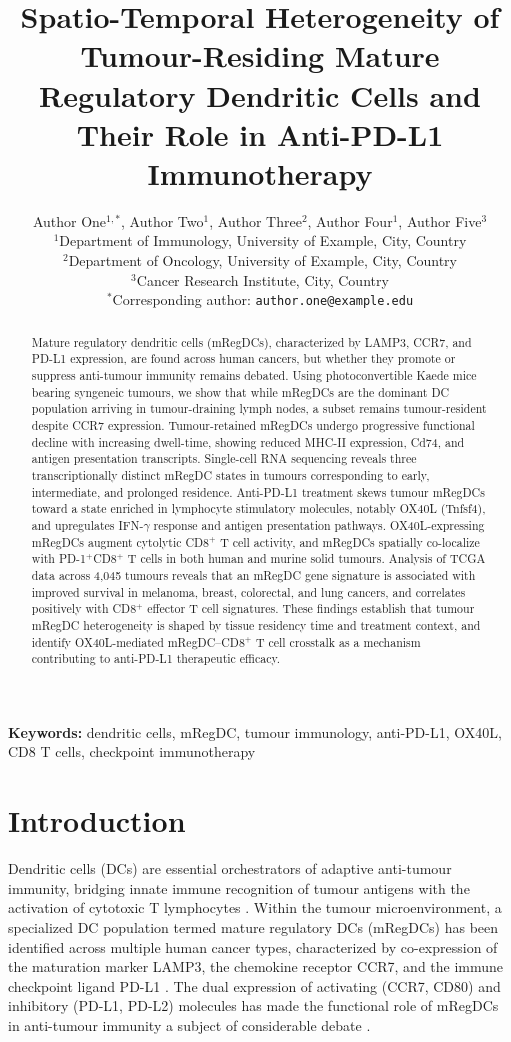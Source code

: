 \documentclass[11pt]{article}
\title{Spatio-Temporal Heterogeneity of Tumour-Residing Mature Regulatory Dendritic Cells and Their Role in Anti-PD-L1 Immunotherapy}
\author{
Author One$^{1,*}$, Author Two$^{1}$, Author Three$^{2}$, Author Four$^{1}$, Author Five$^{3}$ \\[6pt]
\small $^{1}$Department of Immunology, University of Example, City, Country \\
\small $^{2}$Department of Oncology, University of Example, City, Country \\
\small $^{3}$Cancer Research Institute, City, Country \\
\small $^{*}$Corresponding author: \texttt{author.one@example.edu}
}
\date{}
\begin{document}
\maketitle

\begin{abstract}
Mature regulatory dendritic cells (mRegDCs), characterized by LAMP3, CCR7, and PD-L1 expression, are found across human cancers, but whether they promote or suppress anti-tumour immunity remains debated. Using photoconvertible Kaede mice bearing syngeneic tumours, we show that while mRegDCs are the dominant DC population arriving in tumour-draining lymph nodes, a subset remains tumour-resident despite CCR7 expression. Tumour-retained mRegDCs undergo progressive functional decline with increasing dwell-time, showing reduced MHC-II expression, Cd74, and antigen presentation transcripts. Single-cell RNA sequencing reveals three transcriptionally distinct mRegDC states in tumours corresponding to early, intermediate, and prolonged residence. Anti-PD-L1 treatment skews tumour mRegDCs toward a state enriched in lymphocyte stimulatory molecules, notably OX40L (Tnfsf4), and upregulates IFN-$\gamma$ response and antigen presentation pathways. OX40L-expressing mRegDCs augment cytolytic CD8$^{+}$ T cell activity, and mRegDCs spatially co-localize with PD-1$^{+}$CD8$^{+}$ T cells in both human and murine solid tumours. Analysis of TCGA data across 4,045 tumours reveals that an mRegDC gene signature is associated with improved survival in melanoma, breast, colorectal, and lung cancers, and correlates positively with CD8$^{+}$ effector T cell signatures. These findings establish that tumour mRegDC heterogeneity is shaped by tissue residency time and treatment context, and identify OX40L-mediated mRegDC--CD8$^{+}$ T cell crosstalk as a mechanism contributing to anti-PD-L1 therapeutic efficacy.
\end{abstract}

\noindent\textbf{Keywords:} dendritic cells, mRegDC, tumour immunology, anti-PD-L1, OX40L, CD8 T cells, checkpoint immunotherapy

\section{Introduction}

Dendritic cells (DCs) are essential orchestrators of adaptive anti-tumour immunity, bridging innate immune recognition of tumour antigens with the activation of cytotoxic T lymphocytes \citep{Wculek2020,Bottcher2020}. Within the tumour microenvironment, a specialized DC population termed mature regulatory DCs (mRegDCs) has been identified across multiple human cancer types, characterized by co-expression of the maturation marker LAMP3, the chemokine receptor CCR7, and the immune checkpoint ligand PD-L1 \citep{Maier2020,Cheng2021}. The dual expression of activating (CCR7, CD80) and inhibitory (PD-L1, PD-L2) molecules has made the functional role of mRegDCs in anti-tumour immunity a subject of considerable debate \citep{Gerhard2021}.
\end{document}
